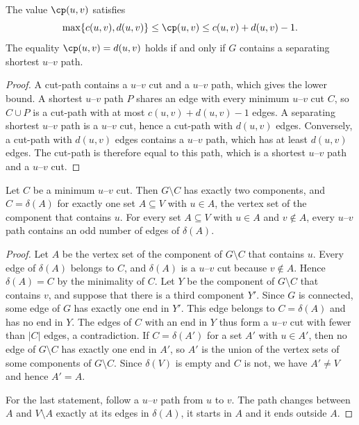 \begin{lemma}
\label{lem:basic-bounds}
The value $\cp(u, v)$ satisfies
\[
\max\{c(u, v), d(u, v)\} \leq \cp(u, v) \leq c(u, v) + d(u, v) - 1.
\]
The equality $\cp(u, v) = d(u, v)$ holds if and only if $G$ contains a separating shortest $u$--$v$ path.
\end{lemma}

\begin{proof}
A cut-path contains a $u$--$v$ cut and a $u$--$v$ path, which gives the lower bound.
A shortest $u$--$v$ path $P$ shares an edge with every minimum $u$--$v$ cut $C$, so $C \cup P$ is a cut-path with at most $c(u, v) + d(u, v) - 1$ edges.
A separating shortest $u$--$v$ path is a $u$--$v$ cut, hence a cut-path with $d(u, v)$ edges.
Conversely, a cut-path with $d(u, v)$ edges contains a $u$--$v$ path, which has at least $d(u, v)$ edges.
The cut-path is therefore equal to this path, which is a shortest $u$--$v$ path and a $u$--$v$ cut.
\end{proof}

\begin{lemma}
\label{lem:minimum-cuts}
Let $C$ be a minimum $u$--$v$ cut.
Then $G \setminus C$ has exactly two components, and $C = \delta(A)$ for exactly one set $A \subseteq V$ with $u \in A$, the vertex set of the component that contains $u$.
For every set $A \subseteq V$ with $u \in A$ and $v \notin A$, every $u$--$v$ path contains an odd number of edges of $\delta(A)$.
\end{lemma}

\begin{proof}
Let $A$ be the vertex set of the component of $G \setminus C$ that contains $u$.
Every edge of $\delta(A)$ belongs to $C$, and $\delta(A)$ is a $u$--$v$ cut because $v \notin A$.
Hence $\delta(A) = C$ by the minimality of $C$.
Let $Y$ be the component of $G \setminus C$ that contains $v$, and suppose that there is a third component $Y'$.
Since $G$ is connected, some edge of $G$ has exactly one end in $Y'$.
This edge belongs to $C = \delta(A)$ and has no end in $Y$.
The edges of $C$ with an end in $Y$ thus form a $u$--$v$ cut with fewer than $|C|$ edges, a contradiction.
If $C = \delta(A')$ for a set $A'$ with $u \in A'$, then no edge of $G \setminus C$ has exactly one end in $A'$, so $A'$ is the union of the vertex sets of some components of $G \setminus C$.
Since $\delta(V)$ is empty and $C$ is not, we have $A' \neq V$ and hence $A' = A$.

For the last statement, follow a $u$--$v$ path from $u$ to $v$.
The path changes between $A$ and $V \setminus A$ exactly at its edges in $\delta(A)$, it starts in $A$ and it ends outside $A$.
\end{proof}

